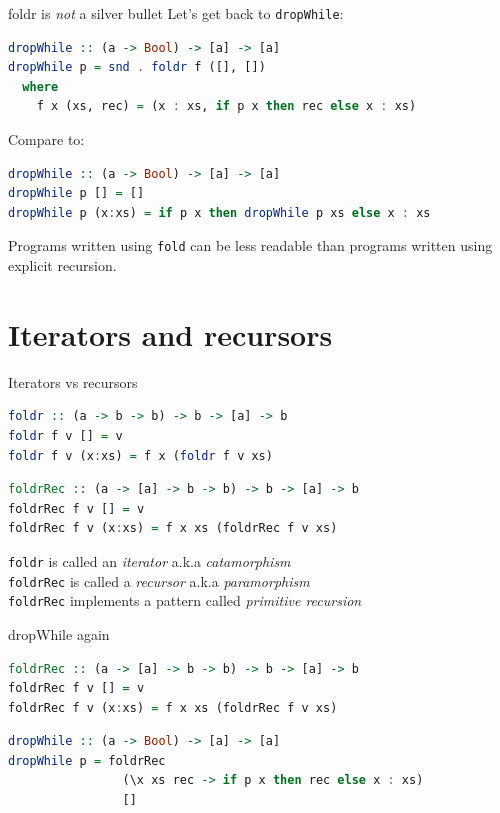 \documentclass[lualatex]{beamer}
\renewcommand{\_}{\textscale{.6}{\textunderscore}}
\begin{document}
\begin{frame}[fragile]{foldr is \emph{not} a silver bullet}
Let's get back to \texttt{dropWhile}:
\vspace{5mm}
\begin{lstlisting}[language=Haskell, morekeywords={foldr}]
dropWhile :: (a -> Bool) -> [a] -> [a]
dropWhile p = snd . foldr f ([], [])
  where
    f x (xs, rec) = (x : xs, if p x then rec else x : xs)
\end{lstlisting}
\pause
Compare to:
\begin{lstlisting}[language=Haskell, morekeywords={foldr}]
dropWhile :: (a -> Bool) -> [a] -> [a]
dropWhile p [] = []
dropWhile p (x:xs) = if p x then dropWhile p xs else x : xs
\end{lstlisting}
\vspace{5mm}
Programs written using \texttt{fold} can be less readable than programs written using explicit recursion.
\end{frame}

\section{Iterators and recursors}

\begin{frame}[fragile]{Iterators vs recursors}
\begin{lstlisting}[language=Haskell, morekeywords={foldr}]
foldr :: (a -> b -> b) -> b -> [a] -> b
foldr f v [] = v
foldr f v (x:xs) = f x (foldr f v xs)
\end{lstlisting}
\vspace{10mm}
\pause
\begin{lstlisting}[language=Haskell, morekeywords={foldr,foldrRec}]
foldrRec :: (a -> [a] -> b -> b) -> b -> [a] -> b
foldrRec f v [] = v
foldrRec f v (x:xs) = f x xs (foldrRec f v xs)
\end{lstlisting}
\vspace{5mm}
\texttt{foldr} is called an \emph{iterator} a.k.a \emph{catamorphism}\\
\texttt{foldrRec} is called a \emph{recursor} a.k.a \emph{paramorphism}\\
\texttt{foldrRec} implements a pattern called \emph{primitive recursion}
\end{frame}

\begin{frame}[fragile]{dropWhile again}
\begin{lstlisting}[language=Haskell, morekeywords={foldr,foldrRec}]
foldrRec :: (a -> [a] -> b -> b) -> b -> [a] -> b
foldrRec f v [] = v
foldrRec f v (x:xs) = f x xs (foldrRec f v xs)
\end{lstlisting}
\vspace{15mm}
\begin{lstlisting}[language=Haskell, morekeywords={foldr}]
dropWhile :: (a -> Bool) -> [a] -> [a]
dropWhile p = foldrRec
                (\x xs rec -> if p x then rec else x : xs)
                []
\end{lstlisting}
\end{frame}
\end{document}
